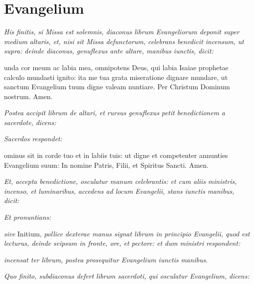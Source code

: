 
\section{Evangelium}

\textit{%
    His finitis, si Missa est solemnis, diaconus librum Evangeliorum deponit
    super medium altaris, et, nisi sit Missa defunctorum, celebrans benedicit
    incensum, ut supra: deinde diaconus, genuflexus ante altare, manibus
    iunctis, dicit:
}

unda cor meum ac labia mea, omnipotens Deus, qui labia Isaiae
prophetae calculo mundasti ignito: ita me tua grata miseratione dignare mundare,
ut sanctum Evangelium tuum digne valeam nuntiare.  Per Christum Dominum nostrum.
Amen.

\textit{%
    Postea accipit librum de altari, et rursus genuflexus petit benedictionem a
    sacerdote, dicens:
}


\textit{Sacerdos respondet:}

ominus sit in corde tuo et in labiis tuis: ut digne et competenter
annunties Evangelium suum: In nomine Patris, Filii, \cross{} et Spiritus Sancti.
Amen.


\textit{%
    Et, accepta benedictione, osculatur manum celebrantis: et cum aliis
    ministris, incenso, et luminaribus, accedens ad locum Evangelii, stans
    iunctis manibus, dicit:
}


\textit{Et pronuntians:}


\textit{sive} Initium, \textit{pollice dexterae manus signat librum in principio
Evangelii, quod est lecturus, deinde seipsum in fronte, ore, et pectore: et dum
ministri respondent:}



\textit{incensat ter librum, postea prosequitur Evangelium iunctis manibus.}


\textit{%
    Quo finito, subdiaconus defert librum sacerdoti, qui osculatur Evangelium,
    dicens:
}

